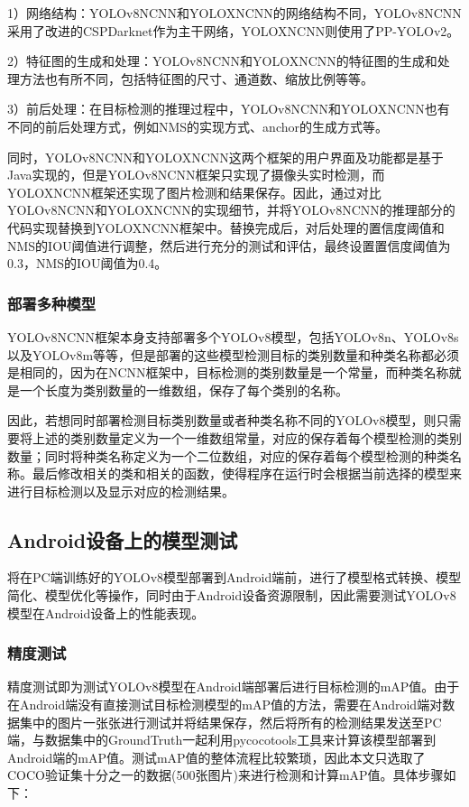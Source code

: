 \documentclass{ctexart}
\numberwithin{equation}{section}%
\numberwithin{figure}{section}%
\numberwithin{table}{section}%
\begin{document}
	1）网络结构：YOLOv8NCNN和YOLOXNCNN的网络结构不同，YOLOv8NCNN采用了改进的CSPDarknet作为主干网络，YOLOXNCNN则使用了PP-YOLOv2。
	
	2）特征图的生成和处理：YOLOv8NCNN和YOLOXNCNN的特征图的生成和处理方法也有所不同，包括特征图的尺寸、通道数、缩放比例等等。
	
	3）前后处理：在目标检测的推理过程中，YOLOv8NCNN和YOLOXNCNN也有不同的前后处理方式，例如NMS的实现方式、anchor的生成方式等。
	
	同时，YOLOv8NCNN和YOLOXNCNN这两个框架的用户界面及功能都是基于Java实现的，但是YOLOv8NCNN框架只实现了摄像头实时检测，而YOLOXNCNN框架还实现了图片检测和结果保存。因此，通过对比YOLOv8NCNN和YOLOXNCNN的实现细节，并将YOLOv8NCNN的推理部分的代码实现替换到YOLOXNCNN框架中。替换完成后，对后处理的置信度阈值和NMS的IOU阈值进行调整，然后进行充分的测试和评估，最终设置置信度阈值为0.3，NMS的IOU阈值为0.4。
	
	\subsubsection{部署多种模型}
	YOLOv8NCNN框架本身支持部署多个YOLOv8模型，包括YOLOv8n、YOLOv8s以及YOLOv8m等等，但是部署的这些模型检测目标的类别数量和种类名称都必须是相同的，因为在NCNN框架中，目标检测的类别数量是一个常量，而种类名称就是一个长度为类别数量的一维数组，保存了每个类别的名称。
	
	因此，若想同时部署检测目标类别数量或者种类名称不同的YOLOv8模型，则只需要将上述的类别数量定义为一个一维数组常量，对应的保存着每个模型检测的类别数量；同时将种类名称定义为一个二位数组，对应的保存着每个模型检测的种类名称。最后修改相关的类和相关的函数，使得程序在运行时会根据当前选择的模型来进行目标检测以及显示对应的检测结果。
	
	\subsection{Android设备上的模型测试}
	将在PC端训练好的YOLOv8模型部署到Android端前，进行了模型格式转换、模型简化、模型优化等操作，同时由于Android设备资源限制，因此需要测试YOLOv8模型在Android设备上的性能表现。
	
	\subsubsection{精度测试}
	精度测试即为测试YOLOv8模型在Android端部署后进行目标检测的mAP值。由于在Android端没有直接测试目标检测模型的mAP值的方法，需要在Android端对数据集中的图片一张张进行测试并将结果保存，然后将所有的检测结果发送至PC端，与数据集中的GroundTruth一起利用pycocotools工具来计算该模型部署到Android端的mAP值。测试mAP值的整体流程比较繁琐，因此本文只选取了COCO验证集十分之一的数据(500张图片)来进行检测和计算mAP值。具体步骤如下：
	
\end{document}
